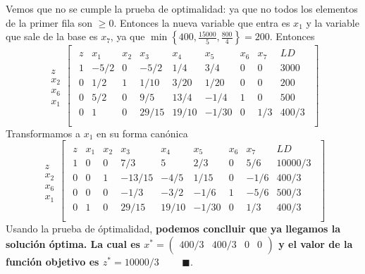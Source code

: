 \documentclass[11pt,letterpaper]{article}
\newcommand{\fin}{$\blacksquare.$}
\begin{document}
\begin{enumerate}
\begin{equation}
\end{equation}
Vemos que no se cumple la prueba de optimalidad: ya que no todos los elementos de la primer fila son $\geq 0$. Entonces la nueva variable que entra es $x_1$ y la variable que sale de la base es $x_7$, ya que $\min\left\{400 ,\frac{15000}{5},\frac{800}{4}\right\}= 200.$ Entonces
\begin{equation}
\begin{array}{c}
\\
z \\ 
x_2 \\
x_6 \\
x_1
\end{array}
\begin{bmatrix}
\begin{array}{c||cccccccc}
  z & x_1 & x_2 & x_3 & x_4 & x_5 & x_6 & x_7 & LD\\ \hline \hline
  1 &-5/2 & 0 &-5/2 &1/4 & 3/4 & 0 & 0 & 3000\\ 
  0 & 1/2 & 1 & 1/10 & 3/20 & 1/20 & 0 & 0 & 200  \\
  0 &  5/2 &  0 & 9/5 & 13/4 & -1/4 & 1 & 0 & 500 \\
  0 &  1 &  0 & 29/15 & 19/10 & -1/30 & 0 & 1/3 & 400/3 \\
\end{array}
\end{bmatrix}
\end{equation}
Transformamos a $x_1$ en su forma canónica
\begin{equation} \label{t_optima_original}
\begin{array}{c}
\\
z \\ 
x_2 \\
x_6 \\
x_1
\end{array}
\begin{bmatrix}
\begin{array}{c||cccccccc}
  z & x_1 & x_2 & x_3 & x_4 & x_5 & x_6 & x_7 & LD\\ \hline \hline
  1 & 0 & 0 & 7/3 & 5 & 2/3 & 0 & 5/6 & 10000/3\\ 
  0 & 0 & 1 &-13/15 & -4/5 & 1/15 & 0 &-1/6 & 400/3  \\
  0 & 0 & 0 &-1/3 & -3/2 & -1/6 & 1 & -5/6& 500/3 \\
  0 & 1 & 0 & 29/15 & 19/10 & -1/30 & 0 & 1/3 & 400/3 \\
\end{array}
\end{bmatrix}
\end{equation}
Usando la prueba de óptimalidad, \textbf{podemos conclluir que ya llegamos la solución óptima. La cual es $x^* = \begin{pmatrix}
400/3 & 400/3 & 0 & 0
\end{pmatrix}$ y el valor de la función objetivo es $z^*=10000/3$} \ \ \ \ \fin


\end{enumerate}
\end{document}
